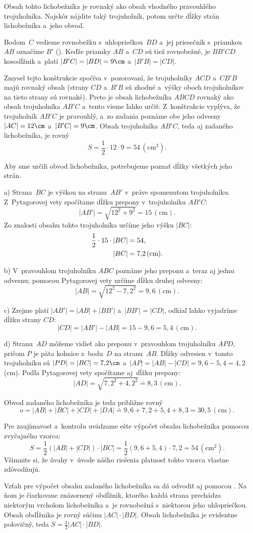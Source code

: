 {%
\napad
Obsah tohto lichobežníka je rovnaký ako obsah vhodného pravouhlého
trojuholníka.
Najskôr nájdite taký trojuholník, potom určte dĺžky strán lichobežníka a~jeho obvod.

\res
Bodom~$C$ vedieme rovnobežku s~uhlopriečkou~$BD$ a~jej priesečník s~priamkou
$AB$ označíme $B'$ (\obr).
Keďže priamky $AB$ a~$CD$ sú tiež rovnobežné, je $BB'CD$ kosodĺžnik a~platí $|B'C|=|BD|=9\cm$ a~$|B'B|=|CD|$.

\noindent
Zmysel tejto konštrukcie spočíva v~pozorovaní, že trojuholníky $ACD$ a~$CB'B$
majú rovnaký obsah
(strany $CD$ a~$B'B$ sú zhodné a~výšky oboch trojuholníkov na tieto strany
sú rovnaké).
Preto je obsah lichobežníka $ABCD$ rovnaký ako obsah trojuholníka $AB'C$ a~tento vieme ľahko určiť:
Z~konštrukcie vyplýva, že trojuholník $AB'C$ je pravouhlý,
a~zo zadania poznáme obe jeho odvesny $|AC|=12\cm$ a~$|B'C|=9\cm$.
Obsah trojuholníka $AB'C$, teda aj zadaného lichobežníka, je rovný
$$
S=\frac12\cdot12\cdot9=54\,(\text{cm}^2).
$$

Aby sme určili obvod lichobežníka, potrebujeme poznať dĺžky všetkých jeho strán.

a)
Strana~$BC$ je výškou na stranu~$AB'$ v~práve spomenutom trojuholníku.
Z~Pytagorovej vety spočítame dĺžku prepony v~trojuholníku $AB'C$:
$$
|AB'|=\sqrt{12^2+9^2}=15\,(\text{cm}).
$$
Zo znalosti obsahu tohto trojuholníka určíme jeho výšku $|BC|$:
$$
\aligned
\frac12\cdot15\cdot \vert BC\vert&=54,\\
\vert BC\vert&=7{,}2\,(\text{cm}).
\endaligned
$$

b)
V~pravouhlom trojuholníku $ABC$ poznáme jeho preponu a~teraz aj jednu
odvesnu; pomocou Pytagorovej vety určíme dĺžku druhej odvesny:
$$
|AB|=\sqrt{12^2-7{,}2^2}=9{,}6\,(\text{cm}).
$$

c)
Zrejme platí $|AB'|=|AB|+|BB'|$ a~$|BB'|=|CD|$, odkiaľ ľahko vyjadríme dĺžku
strany $CD$:
$$
|CD|=|AB'|-|AB|=15-9{,}6=5{,}4\,(\text{cm}).
$$

d)
Stranu~$AD$ môžeme vidieť ako preponu v~pravouhlom trojuholníku $APD$, pričom
$P$ je päta kolmice z~bodu~$D$ na stranu~$AB$.
Dĺžky odvesien v~tomto trojuholníku sú $|PD|=|BC|=7{,}2\cm$ a~$|AP|=|AB|-|CD|=9{,}6-5{,}4=4{,}2$\,(cm).
Podľa Pytagorovej vety spočítame aj~dĺžku prepony:
$$
|AD|=\sqrt{7{,}2^2+4{,}2^2}\doteq 8{,}3\,(\text{cm}).
$$

Obvod zadaného lichobežníka je teda približne rovný
$$
o=|AB|+|BC|+|CD|+|DA| \doteq9{,}6+7{,}2+5{,}4+8{,}3 =30{,}5\,(\text{cm}).
$$

\poznamka
Pre zaujímavosť a~kontrolu uvádzame ešte výpočet obsahu lichobežníka pomocou
zvyčajného vzorca:
$$
S=\frac12(|AB|+|CD|)\cdot|BC|=\frac12(9{,}6+5{,}4)\cdot7{,}2=54\,(\text{cm}^2).
$$
Všimnite si, že úvahy v~úvode nášho riešenia platnosť tohto vzorca
vlastne zdôvodňujú.

Vzťah pre výpočet obsahu zadaného lichobežníka sa dá odvodiť aj pomocou \obr.
Na ňom je čiarkovane znázornený obdĺžnik, ktorého každá strana prechádza niektorým
vrcholom lichobežníka a~je rovnobežná s~niektorou jeho uhlopriečkou.
Obsah obdĺžnika je rovný súčinu $|AC|\cdot|BD|$.
Obsah lichobežníka je evidentne polovičný, teda $S=\frac12|AC|\cdot|BD|$.
}

